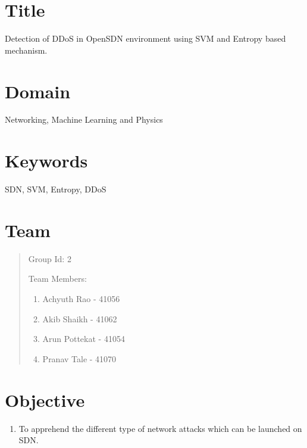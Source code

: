 \documentclass[12pt,a4paper,final]{article}
\begin{document}
\tableofcontents
\listoffigures
\listoftables

\section{Title}
\setcounter{page}{1}
\begin{flushleft}
\normalsize
Detection of DDoS in OpenSDN environment using SVM and Entropy based mechanism.
\linebreak

\noindent
\section{Domain}
Networking, Machine Learning and Physics
\linebreak

\noindent
\section{Keywords}
SDN, SVM, Entropy, DDoS
\linebreak

\noindent
\section{Team}
\begin{quotation}
Group Id: 2 \hfill
\linebreak

Team Members: 
\begin{enumerate}
\item
Achyuth Rao - 41056

\item
Akib Shaikh - 41062

\item
Arun Pottekat - 41054

\item
Pranav Tale - 41070
\end{enumerate}
\end{quotation}

\noindent
\section{Objective}
\begin{enumerate}
\item
To apprehend the different type of network attacks which can be launched on SDN.


\end{enumerate}
\end{flushleft}
\end{document}
